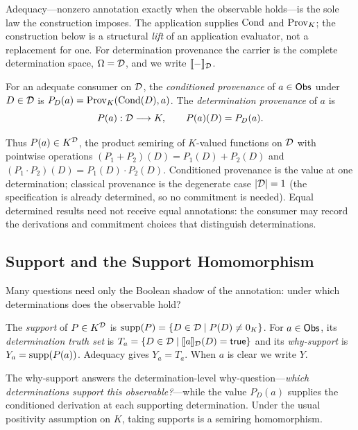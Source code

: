 \noindent
Adequacy---nonzero annotation exactly when the observable holds---is the sole
law the construction imposes. The application supplies $\operatorname{Cond}$ and $\operatorname{Prov}_K$;
the construction below is a structural \emph{lift} of an application
evaluator, not a replacement for one. For determination provenance the carrier
is the complete determination space, $\Omega = \mathcal{D}$, and we write
$\llbracket - \rrbracket_{\mathcal{D}}$.

\begin{definition}
  \label{def:det-provenance}
  For an adequate consumer on $\mathcal{D}$, the \emph{conditioned provenance} of
  $a \in \mathsf{Obs}$ under $D \in \mathcal{D}$ is $P_D(a) = \operatorname{Prov}_K(\operatorname{Cond}(D), a)$. The
  \emph{determination provenance} of $a$ is
  \[
    P(a) : \mathcal{D} \longrightarrow K, \qquad P(a)(D) = P_D(a) .
  \]
\end{definition}

\noindent
Thus $P(a) \in K^{\mathcal{D}}$, the product semiring of $K$-valued functions on
$\mathcal{D}$ with pointwise operations
$(P_1 + P_2)(D) = P_1(D)+P_2(D)$ and
$(P_1 \cdot P_2)(D) = P_1(D)\cdot P_2(D)$. Conditioned provenance is the value
at one determination; classical provenance is the degenerate case
$|\mathcal{D}| = 1$ (the specification is already determined, so no commitment is
needed). Equal determined results need not receive equal annotations: the
consumer may record the derivations and commitment choices that distinguish
determinations.

\subsection{Support and the Support Homomorphism}
\label{sec:support}

Many questions need only the Boolean shadow of the annotation: under which
determinations does the observable hold?

\begin{definition}
  \label{def:support}
  The \emph{support} of $P \in K^{\mathcal{D}}$ is
  $\operatorname{supp}(P) = \{D \in \mathcal{D} \mid P(D) \neq 0_K\}$. For $a \in \mathsf{Obs}$, its
  \emph{determination truth set} is $T_a = \{D \in \mathcal{D} \mid \llbracket a \rrbracket_{\mathcal{D}}(D) = \mathsf{true}\}$
  and its \emph{why-support} is $Y_a = \operatorname{supp}(P(a))$. Adequacy gives
  $Y_a = T_a$. When $a$ is clear we write $Y$.
\end{definition}

The why-support answers the determination-level why-question---\emph{which
determinations support this observable?}---while the value $P_D(a)$ supplies
the conditioned derivation at each supporting determination. Under the usual
positivity assumption on $K$, taking supports is a semiring homomorphism.

